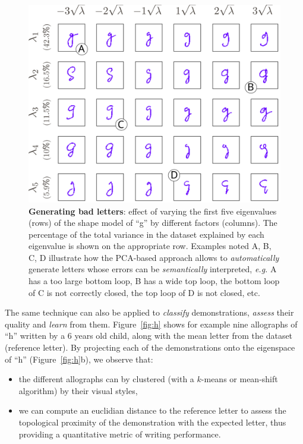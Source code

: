 \documentclass{article}
\newcommand{\eg}{\textit{e.g.}\xspace}
\begin{document}
\begin{figure}
    \centering
    \includegraphics[width=0.9\linewidth]{cowriter-g}
    \caption{\small \label{fig:sampleLetters} \textbf{Generating bad letters}:
        effect of varying the first five eigenvalues (rows) of the shape model
        of ``g'' by different factors (columns). The percentage of the total
        variance in the dataset explained by each eigenvalue is shown      on
        the appropriate row. Examples noted A, B, C, D illustrate how the
        PCA-based approach allows to \emph{automatically} generate letters whose
        errors can be \emph{semantically} interpreted, \eg A has a too large bottom
        loop, B has a wide top loop, the bottom loop of C is not correctly
        closed, the top loop of D is not closed, etc.}

\end{figure}

The same technique can also be applied to \emph{classify} demonstrations,
\emph{assess} their quality and \emph{learn} from them. Figure~\ref{fig:h} shows
for example nine allographs of ``h'' written by a 6 years old child, along with
the mean letter from the dataset (reference letter). By projecting each of the
demonstrations onto the eigenspace of ``h'' (Figure~\ref{fig:h}b), we observe
that:

\begin{itemize}
    \item the different allographs can by clustered (with a $k$-means or
        mean-shift algorithm) by their visual styles,

    \item we can compute an euclidian distance to the reference letter to assess
        the topological proximity of the demonstration with the expected letter,
        thus providing a quantitative metric of writing performance.

\end{itemize}
\end{document}
